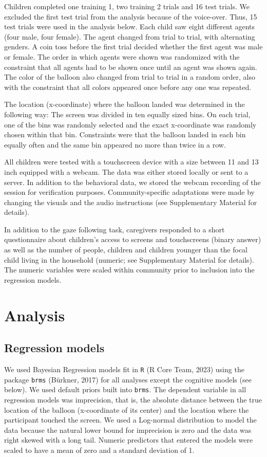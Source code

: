 \documentclass[
  man,floatsintext]{apa7}
\begin{document}
Children completed one training 1, two training 2 trials and 16 test trials. We excluded the first test trial from the analysis because of the voice-over. Thus, 15 test trials were used in the analysis below. Each child saw eight different agents (four male, four female). The agent changed from trial to trial, with alternating genders. A coin toss before the first trial decided whether the first agent was male or female. The order in which agents were shown was randomized with the constraint that all agents had to be shown once until an agent was shown again. The color of the balloon also changed from trial to trial in a random order, also with the constraint that all colors appeared once before any one was repeated.

The location (x-coordinate) where the balloon landed was determined in the following way: The screen was divided in ten equally sized bins. On each trial, one of the bins was randomly selected and the exact x-coordinate was randomly chosen within that bin. Constraints were that the balloon landed in each bin equally often and the same bin appeared no more than twice in a row.

All children were tested with a touchscreen device with a size between 11 and 13 inch equipped with a webcam. The data was either stored locally or sent to a server. In addition to the behavioral data, we stored the webcam recording of the session for verification purposes. Community-specific adaptations were made by changing the visuals and the audio instructions (see Supplementary Material for details).

In addition to the gaze following task, caregivers responded to a short questionnaire about children's access to screens and touchscreens (binary answer) as well as the number of people, children and children younger than the focal child living in the household (numeric; see Supplementary Material for details). The numeric variables were scaled within community prior to inclusion into the regression models.

\section{Analysis}\label{analysis}

\subsection{Regression models}\label{regression-models}

We used Bayesian Regression models fit in \texttt{R} (R Core Team, 2023) using the package \texttt{brms} (Bürkner, 2017) for all analyses except the cognitive models (see below). We used default priors built into \texttt{brms}. The dependent variable in all regression models was imprecision, that is, the absolute distance between the true location of the balloon (x-coordinate of its center) and the location where the participant touched the screen. We used a Log-normal distribution to model the data because the natural lower bound for imprecision is zero and the data was right skewed with a long tail. Numeric predictors that entered the models were scaled to have a mean of zero and a standard deviation of 1.
\end{document}
